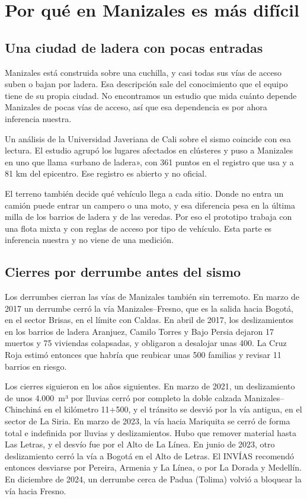 \section{Por qué en Manizales es más difícil}

\subsection{Una ciudad de ladera con pocas entradas}

Manizales está construida sobre una cuchilla, y casi todas sus vías de acceso suben o bajan por ladera. Esa descripción sale del conocimiento que el equipo tiene de su propia ciudad. No encontramos un estudio que mida cuánto depende Manizales de pocas vías de acceso, así que esa dependencia es por ahora inferencia nuestra.

Un análisis de la Universidad Javeriana de Cali sobre el sismo coincide con esa lectura. El estudio agrupó los lugares afectados en clústeres y puso a Manizales en uno que llama «urbano de ladera», con 361 puntos en el registro que usa y a 81 km del epicentro. Ese registro es abierto y no oficial.

El terreno también decide qué vehículo llega a cada sitio. Donde no entra un camión puede entrar un campero o una moto, y esa diferencia pesa en la última milla de los barrios de ladera y de las veredas. Por eso el prototipo trabaja con una flota mixta y con reglas de acceso por tipo de vehículo. Esta parte es inferencia nuestra y no viene de una medición.

\subsection{Cierres por derrumbe antes del sismo}

Los derrumbes cierran las vías de Manizales también sin terremoto. En marzo de 2017 un derrumbe cerró la vía Manizales–Fresno, que es la salida hacia Bogotá, en el sector Brisas, en el límite con Caldas. En abril de 2017, los deslizamientos en los barrios de ladera Aranjuez, Camilo Torres y Bajo Persia dejaron 17 muertos y 75 viviendas colapsadas, y obligaron a desalojar unas 400. La Cruz Roja estimó entonces que habría que reubicar unas 500 familias y revisar 11 barrios en riesgo.

Los cierres siguieron en los años siguientes. En marzo de 2021, un deslizamiento de unos 4.000~m³ por lluvias cerró por completo la doble calzada Manizales–Chinchiná en el kilómetro 11+500, y el tránsito se desvió por la vía antigua, en el sector de La Siria. En marzo de 2023, la vía hacia Mariquita se cerró de forma total e indefinida por lluvias y deslizamientos. Hubo que remover material hasta Las Letras, y el desvío fue por el Alto de La Línea. En junio de 2023, otro deslizamiento cerró la vía a Bogotá en el Alto de Letras. El INVÍAS recomendó entonces desviarse por Pereira, Armenia y La Línea, o por La Dorada y Medellín. En diciembre de 2024, un derrumbe cerca de Padua (Tolima) volvió a bloquear la vía hacia Fresno.


